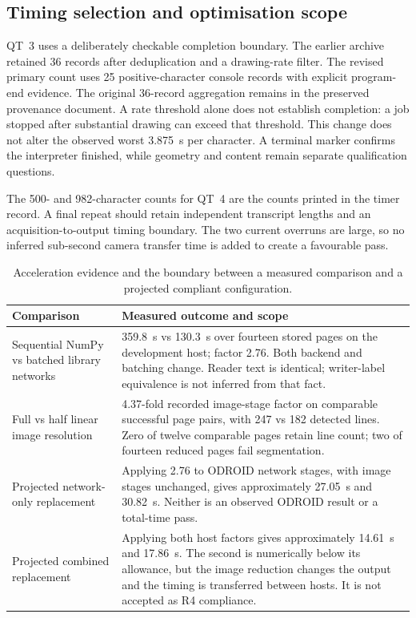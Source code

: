 \subsection{Timing selection and optimisation scope}
\label{app:res-speed}
QT~3 uses a deliberately checkable completion boundary. The earlier archive retained 36 records after deduplication and a drawing-rate filter. The revised primary count uses 25 positive-character console records with explicit program-end evidence. The original 36-record aggregation remains in the preserved provenance document. A rate threshold alone does not establish completion: a job stopped after substantial drawing can exceed that threshold. This change does not alter the observed worst 3.875~s per character. A terminal marker confirms the interpreter finished, while geometry and content remain separate qualification questions.

The 500- and 982-character counts for QT~4 are the counts printed in the timer record. A final repeat should retain independent transcript lengths and an acquisition-to-output timing boundary. The two current overruns are large, so no inferred sub-second camera transfer time is added to create a favourable pass.

\begin{table}[!htbp]\centering\small
\begin{tabularx}{\linewidth}{lX}\toprule
\textbf{Comparison} & \textbf{Measured outcome and scope}\\\midrule
Sequential NumPy vs batched library networks & 359.8~s vs 130.3~s over fourteen stored pages on the development host; factor 2.76. Both backend and batching change. Reader text is identical; writer-label equivalence is not inferred from that fact.\\[4pt]
Full vs half linear image resolution & 4.37-fold recorded image-stage factor on comparable successful page pairs, with 247 vs 182 detected lines. Zero of twelve comparable pages retain line count; two of fourteen reduced pages fail segmentation.\\[4pt]
Projected network-only replacement & Applying 2.76 to ODROID network stages, with image stages unchanged, gives approximately 27.05~s and 30.82~s. Neither is an observed ODROID result or a total-time pass.\\[4pt]
Projected combined replacement & Applying both host factors gives approximately 14.61~s and 17.86~s. The second is numerically below its allowance, but the image reduction changes the output and the timing is transferred between hosts. It is not accepted as R4 compliance.\\\bottomrule
\end{tabularx}
\caption{Acceleration evidence and the boundary between a measured comparison and a projected compliant configuration.}\label{tab:app-acceleration}\end{table}

